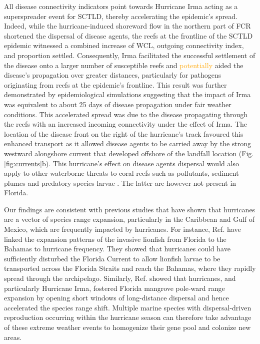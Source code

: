 \documentclass[fleqn,10pt]{wlscirep}
\newcommand{\modif}[1]{\textcolor{orange}{#1}}
\begin{document}
All disease connectivity indicators point towards Hurricane Irma acting as a superspreader event for SCTLD, thereby accelerating the epidemic's spread. Indeed, while the hurricane-induced shoreward flow in the northern part of FCR shortened the dispersal of disease agents, the reefs at the frontline of the SCTLD epidemic witnessed a combined increase of WCL, outgoing connectivity index, and proportion settled. Consequently, Irma facilitated the successful settlement of the disease onto a larger number of susceptible reefs and \modif{potentially} aided the disease's propagation over greater distances, particularly for pathogens originating from reefs at the epidemic's frontline. This result was further demonstrated by epidemiological simulations suggesting that the impact of Irma was equivalent to about 25 days of disease propagation under fair weather conditions. This accelerated spread was due to the disease propagating through the reefs with an increased incoming connectivity under the effect of Irma. The location of the disease front on the right of the hurricane's track favoured this enhanced transport as it allowed disease agents to be carried away by the strong westward alongshore current that developed offshore of the landfall location (Fig. \ref{fig:currents}b). This hurricane's effect on disease agents dispersal would also apply to other waterborne threats to coral reefs such as pollutants, sediment plumes and predatory species larvae \citep{pratchett2017thirty}. The latter are however not present in Florida.

Our findings are consistent with previous studies that have shown that hurricanes are a vector of species range expansion, particularly in the Caribbean and Gulf of Mexico, which are frequently impacted by hurricanes. For instance, Ref. \cite{Johnston2015hurricanes} have linked the expansion patterns of the invasive lionfish from Florida to the Bahamas to hurricane frequency. They showed that hurricanes could have sufficiently disturbed the Florida Current to allow lionfish larvae to be transported across the Florida Straits and reach the Bahamas, where they rapidly spread through the archipelago. Similarly, Ref. \cite{kennedy2020hurricanes} showed that hurricanes, and particularly Hurricane Irma, fostered Florida mangrove pole-ward range expansion by opening short windows of long-distance dispersal and hence accelerated the species range shift.  Multiple marine species with dispersal-driven reproduction occurring within the hurricane season can therefore take advantage of these extreme weather events to homogenize their gene pool and colonize new areas.
\end{document}
